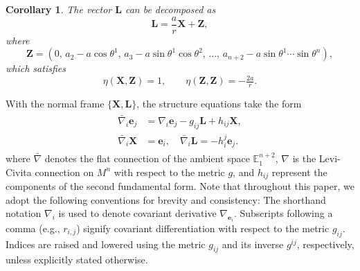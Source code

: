 \documentclass[reqno,11pt, letterpaper]{amsart}
\def\E{{\mathbb E}}
\theoremstyle{plain}
\newtheorem{cor}[thm]{Corollary}
\theoremstyle{definition}
\numberwithin{equation}{section}
\begin{document}
\begin{cor}
	The vector $\mathbf{L}$ can be decomposed as
	\[
	\mathbf{L} = \frac{a}{r}\mathbf{X} + \mathbf{Z},
	\]
	where
	\[
	\mathbf{Z} = \left(0,\, a_2 - a\cos\theta^1,\, a_3 - a\sin\theta^1\cos\theta^2,\, \dots,\, a_{n+2} - a\sin\theta^1\cdots\sin\theta^n\right),
	\]
	which satisfies
	\[
	\eta(\mathbf{X}, \mathbf{Z}) = 1, \qquad \eta(\mathbf{Z}, \mathbf{Z}) = -\tfrac{2a}{r}.
	\]
\end{cor}
     With the normal frame $\{\mathbf{X}, \mathbf{L}\}$, the structure equations take the form
     \begin{gather}\label{eqn-stru}
     	\begin{split}
     		\bar{\nabla}_i\mathbf{e}_j &= \nabla_i\mathbf{e}_j - g_{ij} \mathbf{L} + h_{ij} \mathbf{X},\\
     		\bar{\nabla}_i\mathbf{X} &= \mathbf{e}_i, \quad \bar{\nabla}_i\mathbf{L} = - h_i^j \mathbf{e}_j.
     	\end{split}
     \end{gather}  
     where $\bar{\nabla}$ denotes the flat connection of the ambient space $\E^{n+2}_1$, $\nabla$ is the Levi-Civita connection on $M^n$ with respect to the metric $g$, and $h_{ij}$ represent the components of the second fundamental form. Note that throughout this paper, we adopt the following conventions for brevity and consistency: The shorthand notation $\nabla_i$ is used to denote  covariant derivative $\nabla_{\mathbf{e}_i}$.
     Subscripts following a comma (e.g., $r_{i,j}$) signify  covariant differentiation with respect to the metric $g_{ij}$. Indices are raised and lowered using the metric $g_{ij}$ and its inverse $g^{ij}$, respectively, unless explicitly stated otherwise.
     
\end{document}
